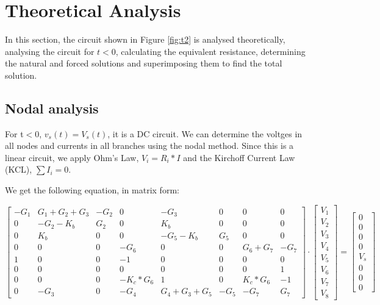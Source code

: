 \section{Theoretical Analysis}
\label{sec:analysis}

In this section, the circuit shown in Figure \ref{fig:t2} is analysed
theoretically, analysing the circuit for $t<0$, calculating the equivalent resistance, determining the natural and forced solutions and superimposing them to find the total solution.

\subsection{Nodal analysis}
For t$<$0,  $v_s(t)= V_s(t)$,  it is a DC circuit. We can determine the voltges in all nodes and currents in all branches using the nodal method.
Since this is a linear circuit,  we apply Ohm's Law,  $V_i= R_i * I$ and the Kirchoff Current Law (KCL),  $\sum I_i = 0$.

We get the following equation,  in matrix form:

\begin{equation}
\label{eq:matrixeq1}
\begin{bmatrix}
    -G_1 & G_1+G_2+G_3 & -G_2 & 0 & -G_3 & 0 & 0 & 0\\
    0 & -G_2-K_b & G_2 & 0 & K_b & 0 & 0 & 0\\
    0 & K_b & 0 & 0 & -G_5-K_b & G_5 & 0 & 0\\
    0 & 0 & 0 & -G_6 & 0 & 0 & G_6+G_7 & -G_7\\
    1 & 0 & 0 & -1 & 0 & 0 & 0 & 0\\
    0 & 0 & 0 & 0 & 0 & 0 & 0 & 1\\
    0 & 0 & 0 & -K_c*G_6 & 1 & 0 & K_c*G_6 & -1\\
    0 & -G_3 & 0 & -G_4 & G_4+G_3+G_5 & -G_5 & -G_7 & G_7
\end{bmatrix}
\cdot
\begin{bmatrix}
V_1 \\
V_2 \\
V_3 \\
V_4 \\
V_5 \\
V_6 \\
V_7 \\
V_8 
\end{bmatrix}
=
\begin{bmatrix}
0 \\
0 \\
0 \\
0\\
V_s\\
0 \\
0 \\
0
\end{bmatrix}
\end{equation}


